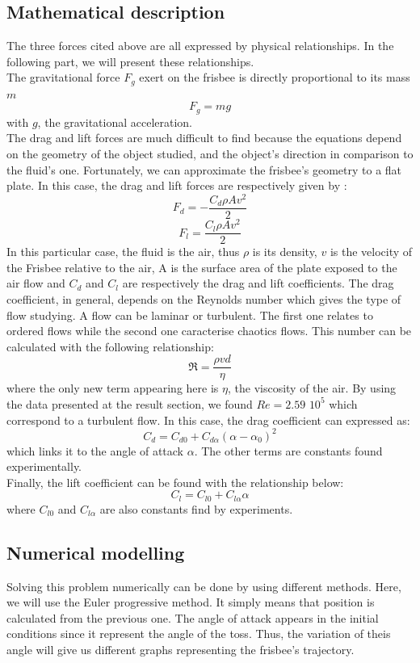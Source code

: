 \documentclass[10pt,a4paper]{report}
\begin{document}
\subsection{Mathematical description}
The three forces cited above are all expressed by physical relationships. In the following part, we will present these relationships.
\\The gravitational force $F_g$ exert on the frisbee is directly proportional to its mass $m$
\[F_g = m g\]
with $g$, the gravitational acceleration.
\\
The drag and lift forces are much difficult to find because the equations depend on the geometry of the object studied, and the object's direction in comparison to the fluid's one. Fortunately, we can approximate the frisbee's geometry to a flat plate. In this case, the drag and lift forces are respectively given by :
\[F_d = -\frac{C_d \rho A  v^2}{2}\]
\[F_l = \frac{C_l \rho A  v^2}{2}\]
In this particular case, the fluid is the air, thus $\rho$ is its density, $v$ is the velocity of the Frisbee relative to the air, A is the surface area of the plate exposed to the air flow and $C_d$ and $C_l$ are respectively the drag and lift coefficients.
The drag coefficient, in general, depends on the Reynolds number which gives the type of flow studying. A flow can be laminar or turbulent. The first one relates to ordered flows while the second one caracterise chaotics flows. This number can be calculated with the following relationship:
\[\Re = \frac{\rho v d}{\eta}\]
where the only new term appearing here is $\eta$, the viscosity of the air.
By using the data presented at the result section, we found $Re=2.59$ $10^5$ which correspond to a turbulent flow.
In this case, the drag coefficient can expressed as:
\[C_d = C_{d0} + C_{d\alpha}(\alpha-\alpha_0)^2\]
\cite{art5}
which links it to the angle of attack $\alpha$. The other terms are constants found experimentally.
\\Finally, the lift coefficient can be found with the relationship below:
\[C_l = C_{l0} + C_{l \alpha} \alpha\]
\cite{art5}
where $C_{l0}$ and $C_{l\alpha}$ are also constants find by experiments.
\subsection{Numerical modelling}
Solving this problem numerically can be done by using different methods. Here, we will use the Euler progressive method. It simply means that position is calculated from the previous one.
The angle of attack appears in the initial conditions since it represent the angle of the toss. Thus, the variation of theis angle will give us different graphs representing the frisbee's trajectory.
\end{document}
